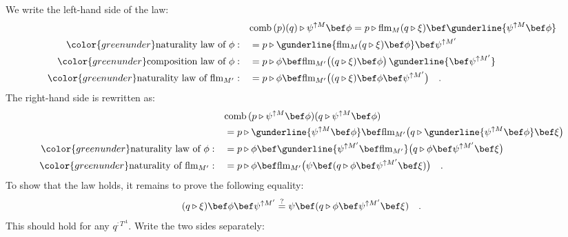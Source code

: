 We write the left-hand side of the law:
\begin{align*}
 & \text{comb}\,(p)(q)\triangleright\psi^{\uparrow M}\bef\phi=p\triangleright\text{flm}_{M}(q\triangleright\xi)\bef\gunderline{\psi^{\uparrow M}\bef\phi}\\
{\color{greenunder}\text{naturality law of }\phi:}\quad & =p\triangleright\gunderline{\text{flm}_{M}(q\triangleright\xi)\bef\phi}\bef\psi^{\uparrow M^{\prime}}\\
{\color{greenunder}\text{composition law of }\phi:}\quad & =p\triangleright\phi\bef\text{flm}_{M^{\prime}}\big((q\triangleright\xi)\bef\phi\big)\,\gunderline{\bef\psi^{\uparrow M^{\prime}}}\\
{\color{greenunder}\text{naturality law of }\text{flm}_{M^{\prime}}:}\quad & =p\triangleright\phi\bef\text{flm}_{M^{\prime}}\big((q\triangleright\xi)\bef\phi\bef\psi^{\uparrow M^{\prime}}\big)\quad.
\end{align*}
The right-hand side is rewritten as:
\begin{align*}
 & \text{comb}\,(p\triangleright\psi^{\uparrow M}\bef\phi)(q\triangleright\psi^{\uparrow M}\bef\phi)\\
 & =p\triangleright\gunderline{\psi^{\uparrow M}\bef\phi}\bef\text{flm}_{M^{\prime}}\big(q\triangleright\gunderline{\psi^{\uparrow M}\bef\phi}\bef\xi\big)\\
{\color{greenunder}\text{naturality law of }\phi:}\quad & =p\triangleright\phi\bef\gunderline{\psi^{\uparrow M^{\prime}}\bef\text{flm}_{M^{\prime}}}\big(q\triangleright\phi\bef\psi^{\uparrow M^{\prime}}\bef\xi\big)\\
{\color{greenunder}\text{naturality of }\text{flm}_{M^{\prime}}:}\quad & =p\triangleright\phi\bef\text{flm}_{M^{\prime}}\big(\psi\bef(q\triangleright\phi\bef\psi^{\uparrow M^{\prime}}\bef\xi)\big)\quad.
\end{align*}
To show that the law holds, it remains to prove the following equality:
\[
(q\triangleright\xi)\bef\phi\bef\psi^{\uparrow M^{\prime}}\overset{?}{=}\psi\bef(q\triangleright\phi\bef\psi^{\uparrow M^{\prime}}\bef\xi)\quad.
\]
This should hold for any $q^{:T^{A}}$. Write the two sides separately:
